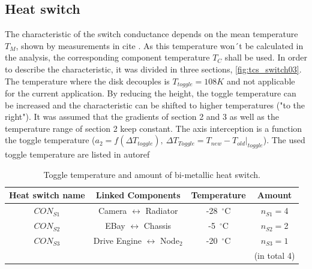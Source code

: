 \subsection{Heat switch} \label{sec:app_therm_3}

The characteristic of the switch conductance depends on the mean temperature $T_M$, shown by measurements in cite .
As this temperature won´t be calculated in the analysis, the corresponding component temperature $T_C$ shall be used.
In order to describe the characteristic, it was divided in three sections, \autoref{fig:tcs_switch03}.
The temperature where the disk decouples is $T_{toggle}=108 K$ and not applicable for the current application.
By reducing the height, the toggle temperature can be increased and the characteristic can be shifted to higher temperatures ("to the right").
It was assumed that the gradients of section 2 and 3 as well as the temperature range of section 2 keep constant.
The axis interception is a function the toggle temperature ($a_2=f(\Delta T_{toggle}),\ \Delta T_{Toggle}=T_{new}-T_{old}|_{toggle}$).
The used toggle temperature are listed in autoref

\begin{table}[H]
	\centering
	\caption{Toggle temperature and amount of bi-metallic heat switch.}
	\begin{tabular}{c@{\quad}ccc}
		\toprule
		Heat switch name  & Linked Components & Temperature  & Amount \\ \midrule
		$CON_{S1}$ & {Camera} $\leftrightarrow$ {Radiator} & -28\ $^\circ$C  & $n_{S1}=$4  \\[1em]
		$CON_{S2}$ & {EBay} $\leftrightarrow$ {Chassis} & -5\ $^\circ$C  & $n_{S2}=$2  \\[1em]
		$CON_{S3}$ & {Drive Engine} $\leftrightarrow$ {Node$_2$} & -20\ $^\circ$C  & $n_{S3}=1$  \\
		&											&						& (in total 4)  \\ \bottomrule
	\end{tabular}
	\label{tab:tcs_toggle}
\end{table}


